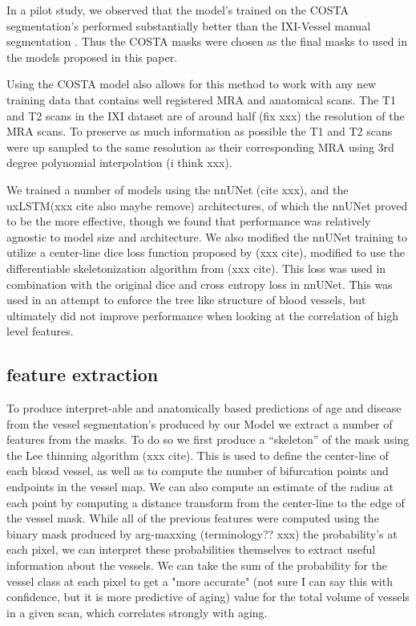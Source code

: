 \documentclass[pdflatex,sn-mathphys-num]{sn-jnl}
\begin{document}
In a pilot study, we observed that the model's trained on the COSTA segmentation's performed substantially better than the IXI-Vessel manual segmentation \cite{XXX}. Thus the COSTA masks were chosen as the final masks to used in the models proposed in this paper.

Using the COSTA model also allows for this method to work with any new training data that contains well registered MRA and anatomical scans. The T1 and T2 scans in the IXI dataset are of around half (fix xxx) the resolution of the MRA scans. To preserve as much information as possible the T1 and T2 scans were up sampled to the same resolution as their corresponding MRA using 3rd degree polynomial interpolation (i think xxx).


We trained a number of models using the nnUNet (cite xxx), and the uxLSTM(xxx cite also maybe remove) architectures, of which the nnUNet proved to be the more effective, though we found that performance was relatively agnostic to model size and architecture. We also modified the nnUNet training to utilize a center-line dice loss function proposed by (xxx cite), modified to use the differentiable skeletonization algorithm from (xxx cite). This loss was used in combination with the original dice and cross entropy loss in nnUNet. This was used in an attempt to enforce the tree like structure of blood vessels, but ultimately did not improve performance when looking at the correlation of high level features.

\subsection{feature extraction}

To produce interpret-able and anatomically based predictions of age and disease from the vessel segmentation's produced by our Model we extract a number of features from the masks. To do so we first produce a ``skeleton'' of the mask using the Lee thinning algorithm (xxx cite). This is used to define the center-line of each blood vessel, as well as to compute the number of bifurcation points and endpoints in the vessel map. We can also compute an estimate of the radius at each point by computing a distance transform from the center-line to the edge of the vessel mask. While all of the previous features were computed using the binary mask produced by arg-maxxing (terminology?? xxx) the probability's at each pixel, we can interpret these probabilities themselves to extract useful information about the vessels. We can take the sum of the probability for the vessel class at each pixel to get a "more accurate" (not sure I can say this with confidence, but it is more predictive of aging) value for the total volume of vessels in a given scan, which correlates strongly with aging.
\end{document}
